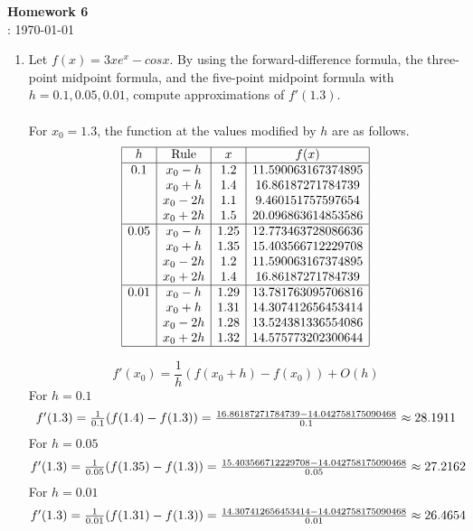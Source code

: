 \documentclass[12pt]{article}
\title{}
\author{Josh Morales}
\date{\today}
\begin{document}
\pagestyle{fancy}
\begin{center}
\textbf{\Large Homework 6} \\
: \today
\end{center}
\begin{enumerate}[leftmargin=2em]
    \item
    Let $f (x) = 3xe^x - cos x$. By using the forward-difference formula, the three-point
midpoint formula, and the five-point midpoint formula with $h = 0.1, 0.05,
0.01$, compute approximations of $f'(1.3)$.\\
\\For $x_0=1.3$, the function at the values modified by $h$ are as follows.
\[
\begin{array}{|c|c|c|c|}
\hline
h & \text{Rule} & x & f(x) \\
\hline
0.1  & x_0 - h  & 1.2  & 11.590063167374895  \\
     & x_0 + h  & 1.4  & 16.86187271784739  \\
     & x_0 - 2h & 1.1  & 9.460151757597654   \\
     & x_0 + 2h & 1.5  & 20.096863614853586  \\
\hline
0.05 & x_0 - h  & 1.25 & 12.773463728086636  \\
     & x_0 + h  & 1.35 & 15.403566712229708  \\
     & x_0 - 2h & 1.2  & 11.590063167374895  \\
     & x_0 + 2h & 1.4  & 16.86187271784739  \\
\hline
0.01 & x_0 - h  & 1.29 & 13.781763095706816  \\
     & x_0 + h  & 1.31 & 14.307412656453414  \\
     & x_0 - 2h & 1.28 & 13.524381336554086  \\
     & x_0 + 2h & 1.32 & 14.575773202300644  \\
\hline
\end{array}
\]


\[
f'(x_0) = \frac{1}{h}(f(x_0+h)-f(x_0)) + O(h)
\]
For $h = 0.1$
\[
\hbox{$f'(1.3) = \frac{1}{0.1}(f(1.4)-f(1.3)) = \frac{16.86187271784739-14.042758175090468}{0.1} \approx 28.1911$}
\]
For $h = 0.05$
\[
\hbox{$f'(1.3) = \frac{1}{0.05}(f(1.35)-f(1.3)) = \frac{15.403566712229708-14.042758175090468}{0.05} \approx 27.2162$}
\]
For $h=0.01$
\[
\hbox{$f'(1.3) = \frac{1}{0.01}(f(1.31)-f(1.3)) = \frac{14.307412656453414-14.042758175090468}{0.01} \approx 26.4654$}
\]

\end{enumerate}
\end{document}
